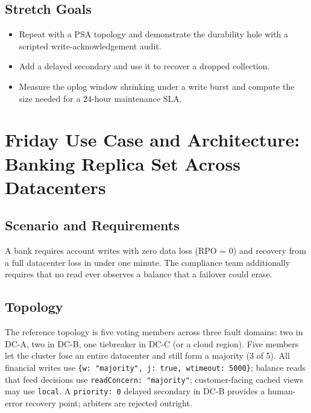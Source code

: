 \subsection*{Stretch Goals}
\begin{itemize}
    \item Repeat with a PSA topology and demonstrate the durability hole with a scripted write-acknowledgement audit.
    \item Add a delayed secondary and use it to recover a dropped collection.
    \item Measure the oplog window shrinking under a write burst and compute the size needed for a 24-hour maintenance SLA.
\end{itemize}

\section{Friday Use Case and Architecture: Banking Replica Set Across Datacenters}
\subsection{Scenario and Requirements}
A bank requires account writes with zero data loss (RPO = 0) and recovery from a full datacenter loss in under one minute. The compliance team additionally requires that no read ever observes a balance that a failover could erase.

\subsection{Topology}
The reference topology is five voting members across three fault domains: two in DC-A, two in DC-B, one tiebreaker in DC-C (or a cloud region). Five members let the cluster lose an entire datacenter and still form a majority (3 of 5). All financial writes use \texttt{\{w: "majority", j: true, wtimeout: 5000\}}; balance reads that feed decisions use \texttt{readConcern: "majority"}; customer-facing cached views may use \texttt{local}. A \texttt{priority: 0} delayed secondary in DC-B provides a human-error recovery point; arbiters are rejected outright.

